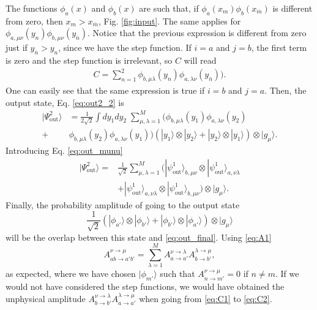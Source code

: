 \documentclass[aps,pra,reprint,amsmath,amssymb]{revtex4-1}
\begin{document}
The functions $\phi_a(x)$ and $\phi_b(x)$ are such that, if $\phi_a(x_m)\phi_b(x_{\overline{m}})$ is different from zero, then $x_m>x_{\overline{m}}$, Fig. \ref{fig:input}. The same applies for $\phi_{a,\mu\nu}(y_n)\phi_{b,\mu\nu}(y_{\overline{n}})$. Notice that the previous expression is different from zero just if $y_{\overline{n}}>y_n$, since we have the step function. If $i=a$ and $j=b$, the first term is zero and the step function is irrelevant, so $C$ will read
\begin{align}\label{eq:C2}
C=\sum_{n=1}^2\phi_{b,\mu\lambda}(y_n)\phi_{a,\lambda\nu}(y_{\overline{n}})).
\end{align}
One can easily see that the same expression is true if $i=b$ and $j=a$. Then, the output state, Eq. \eqref{eq:out2_2} is
\begin{align}
|\Psi_\text{out}^2\rangle &=\frac{1}{2\sqrt{2}}\int dy_1dy_2\;\sum_{\mu,\lambda=1}^M(\phi_{b,\mu\lambda}(y_1)\phi_{a,\lambda\nu}(y_2)\nonumber\\
+&\phi_{b,\mu\lambda}(y_2)\phi_{a,\lambda\nu}(y_1))(|y_1\rangle\otimes|y_2\rangle + |y_2\rangle\otimes|y_1\rangle)\otimes|g_\mu\rangle.
\end{align}
Introducing Eq. \eqref{eq:out_munu}
\begin{align}\label{eq:out_final}
|\Psi_\text{out}^2\rangle =&\frac{1}{\sqrt{2}}\sum_{\mu,\lambda=1}^M(|\psi_\text{out}^1\rangle_{b,\mu\nu}\otimes|\psi_\text{out}^1\rangle_{a,\nu\lambda}  \nonumber\\
& + |\psi_\text{out}^1\rangle_{a,\nu\lambda}\otimes|\psi_\text{out}^1\rangle_{b,\mu\nu})\otimes|g_\mu\rangle.
\end{align}
Finally, the probability amplitude of going to the output state
\begin{equation}
\frac{1}{\sqrt{2}}(|\phi_{a'}\rangle\otimes|\phi_{b'}\rangle+|\phi_{b'}\rangle\otimes|\phi_{a'}\rangle)\otimes|g_\mu\rangle
\end{equation}
will be the overlap between this state and \eqref{eq:out_final}. Using \eqref{eq:A1}
\begin{equation}
A_{ab\to a'b'}^{\nu\to\mu}=\sum_{\lambda=1}^M A_{a\to a'}^{\nu\to\lambda} A_{b\to b'}^{\lambda\to\mu},
\end{equation}
as expected, where we have chosen $|\phi_{m'}\rangle$ such that $A_{n\to m'}^{\nu\to \mu}=0$ if $n\neq m$. If we would not have considered the step functions, we would have obtained the unphysical amplitude $A_{b\to b'}^{\nu\to\lambda} A_{a\to a'}^{\lambda\to\mu}$ when going from \eqref{eq:C1} to \eqref{eq:C2}.
\end{document}
